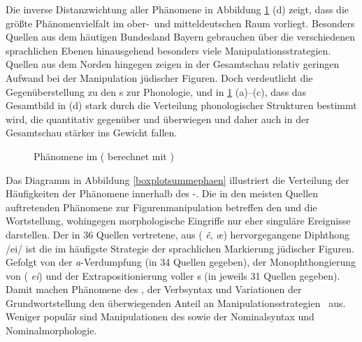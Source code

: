 Die inverse Distanzwichtung aller Phänomene in Abbildung \ref{alleIDWs} (d)   zeigt, dass die größte Phänomenvielfalt im ober-\, und mitteldeutschen Raum vorliegt.  Besonders Quellen aus dem häutigen Bundesland Bayern gebrauchen über die verschiedenen sprachlichen Ebenen hinausgehend besonders viele Manipulationsstrategien. Quellen aus dem Norden hingegen zeigen in der Gesamtschau relativ geringen Aufwand bei der Manipulation jüdischer Figuren. Doch verdeutlicht die Gegenüberstellung zu den s zur Phonologie,  und  in \ref{alleIDWs} (a)–(c), dass das Gesamtbild in (d) 
 stark durch die Verteilung phonologischer Strukturen bestimmt wird, die quantitativ gegenüber  und  überwiegen und daher auch in der Gesamtschau stärker ins Gewicht fallen.

 
 

 
\begin{figure}
\farbgrafik %
\hfill
{}
\caption{Phänomene im  ( berechnet mit )}
\label{alleIDWs}
\end{figure}



 
Das Diagramm in Abbildung \ref{boxplotsummephaen} illustriert die Verteilung der Häufigkeiten der Phänomene innerhalb des -. Die in den meisten Quellen auftretenden Phänomene zur Figurenmanipulation betreffen den  und die Wortstellung, wohingegen morphologische Eingriffe nur eher singuläre Ereignisse darstellen. Der in 36 Quellen vertretene, aus  ({\mhd} \textit{ê}, \textit{œ}) hervorgegangene Diphthong /ei/ ist die im  häufigste Strategie der sprachlichen Markierung jüdischer Figuren. Gefolgt von der \textit{a}-Verdumpfung (in 34 Quellen gegeben), der Monophthongierung von  ({\mhd} \textit{ei}) und der Extrapositionierung voller \hai{{\NP}}s (in jeweils 31 Quellen gegeben). Damit machen Phänomene des , der Verbsyntax und Variationen der Grundwortstellung den überwiegenden Anteil an Manipulationsstrategien \,%
 aus. Weniger populär sind Manipulationen des  sowie der Nominalsyntax und Nominalmorphologie.


